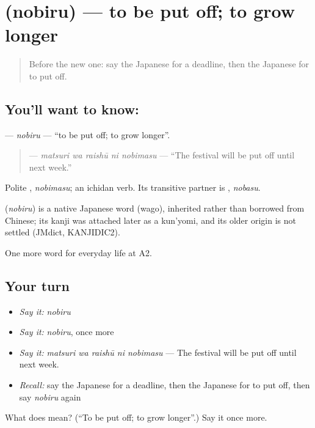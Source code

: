\section[\texorpdfstring{\ja{のびる} (nobiru)}{のびる (nobiru)}]{ (nobiru) — to be put off; to grow longer}

\label{lesson:JA-C168-nobiru}



\begin{quote}
Before the new one: say the Japanese for a deadline, then the Japanese for to put off.
\end{quote}

\subsection*{You'll want to know: }
\textbf{} — \emph{nobiru} — \textquotedblleft{}to be put off; to grow longer\textquotedblright{}.

\begin{quote}
\textbf{  } — \emph{matsuri wa raishū ni nobimasu} — \textquotedblleft{}The festival will be put off until next week.\textquotedblright{}
\end{quote}

Polite \textbf{}, \emph{nobimasu}; an ichidan verb. Its transitive partner is \textbf{}, \emph{nobasu}.

\begin{cousinweb}
\textbf{} (\emph{nobiru}) is a native Japanese word (wago), inherited rather than borrowed from Chinese; its kanji was attached later as a kun'yomi, and its older origin is not settled (JMdict, KANJIDIC2).
\end{cousinweb}

\begin{grammarlens}[title={What you've built}]
One more word for everyday life at A2.
\end{grammarlens}

\subsection*{Your turn}
\begin{itemize}
\raggedright
  \item \emph{Say it:} \emph{nobiru}
  \item \emph{Say it:} \emph{nobiru}, once more
  \item \emph{Say it:} \emph{matsuri wa raishū ni nobimasu} — The festival will be put off until next week.
  \item \emph{Recall:} say the Japanese for a deadline, then the Japanese for to put off, then say \emph{nobiru} again
\end{itemize}

\begin{tcolorbox}[breakable,colback=teal!4,colframe=teal!35!black,title={Before you move on}]
What does  mean? (\textquotedblleft{}To be put off; to grow longer\textquotedblright{}.) Say it once more.
\end{tcolorbox}
